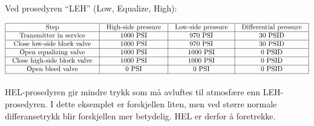 \vskip 10pt

Ved prosedyren ``LEH'' (Low, Equalize, High):


$$\vbox{\offinterlineskip
\halign{\strut
\vrule \quad\hfil # \ \hfil & 
\vrule \quad\hfil # \ \hfil & 
\vrule \quad\hfil # \ \hfil & 
\vrule \quad\hfil # \ \hfil \vrule \cr
\noalign{\hrule}
%
Step & High-side pressure & Low-side pressure & Differential pressure \cr
%
\noalign{\hrule}
%
Transmitter in service & 1000 PSI & 970 PSI & 30 PSID \cr
%
\noalign{\hrule}
%
Close low-side block valve & 1000 PSI & 970 PSI & 30 PSID \cr
%
\noalign{\hrule}
%
Open equalizing valve & 1000 PSI & 1000 PSI & 0 PSID \cr
%
\noalign{\hrule}
%
Close high-side block valve & 1000 PSI & 1000 PSI & 0 PSID \cr
%
\noalign{\hrule}
%
Open bleed valve & 0 PSI & 0 PSI & 0 PSID \cr
%
\noalign{\hrule}
} %
}$$ %

\vskip 10pt

HEL-prosedyren gir mindre trykk som må avluftes til atmosfære enn LEH-prosedyren.  I dette eksemplet er forskjellen liten, men ved større normale differansetrykk blir forskjellen mer betydelig.  HEL er derfor å foretrekke.



